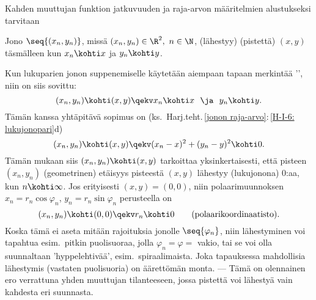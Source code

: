 Kahden muuttujan funktion jatkuvuuden ja raja-arvon määritelmien alustukseksi tarvitaan
\begin{Def} \label{lukuparijonon suppeneminen} 
Jono $\seq{(x_n,y_n)}$, missä 
$(x_n,y_n) \in \R^2,\ n\in\N$,  (lähestyy)  (pistettä) 
$(x,y)$ täsmälleen kun $x_n \kohti x$ ja $y_n \kohti y$. 
\end{Def}
Kun lukuparien jonon suppenemiselle käytetään aiempaan tapaan merkintää '\kohti', niin on siis 
sovittu:
\[ 
(x_n,y_n) \kohti (x,y) \qekv x_n \kohti x\ \ \ja\ \ y_n \kohti y. 
\]
Tämän kanssa yhtäpitävä sopimus on 
(ks.\ Harj.teht.\,\ref{jonon raja-arvo}:\,\ref{H-I-6: lukujonopari}d)
\[
(x_n,y_n)\kohti(x,y) \qekv (x_n-x)^2+(y_n-y)^2 \kohti 0.
\]
Tämän mukaan siis $(x_n,y_n)\kohti(x,y)$ tarkoittaa yksinkertaisesti, että pisteen
$(x_n,y_n)$ (geometrinen) etäisyys pisteestä $(x,y)$ lähestyy (lukujonona) $0$:aa, kun
$n\kohti\infty$. Jos erityisesti $(x,y)=(0,0)$, niin polaarimuunnoksen $x_n=r_n\cos\varphi_n$,
$y_n=r_n\sin\varphi_n$ perusteella on
\[
(x_n,y_n)\kohti(0,0) \qekv r_n \kohti 0 \qquad \text{(polaarikoordinaatisto)}.
\]
Koska tämä ei aseta mitään rajoituksia jonolle $\seq{\varphi_n}$, niin lähestyminen voi
tapahtua esim.\ pitkin puolisuoraa, jolla $\varphi_n=\varphi=$ vakio, tai se voi olla
suunnaltaan 'hyppelehtivää', esim.\ spiraalimaista. Joka tapauksessa mahdollisia
lähestymis\- (vastaten puolisuoria) on äärettömän monta. --- Tämä on olennainen
ero verrattuna yhden muuttujan tilanteeseen, jossa pistettä voi lähestyä vain kahdesta eri
suunnasta.

